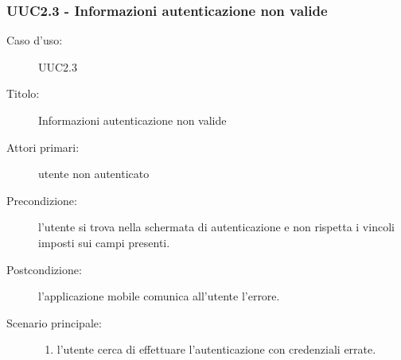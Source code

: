 \documentclass[../../../analisi-dei-requisiti.tex]{subfiles}
\begin{document}
\subsubsection{UUC2.3 - Informazioni autenticazione non valide}%
\label{subs:UUC2.3}
\begin{description}
  \item[Caso d’uso:] UUC2.3
  \item[Titolo:] Informazioni autenticazione non valide
  \item[Attori primari:] utente non autenticato
  \item[Precondizione:] l'utente si trova nella schermata di autenticazione e non rispetta i vincoli imposti sui campi presenti.
  \item[Postcondizione:] l'applicazione mobile comunica all'utente l'errore.
  \item[Scenario principale:]
        \begin{enumerate}
          \item l'utente cerca di effettuare l'autenticazione con credenziali errate.
        \end{enumerate}
\end{description}
\end{document}
